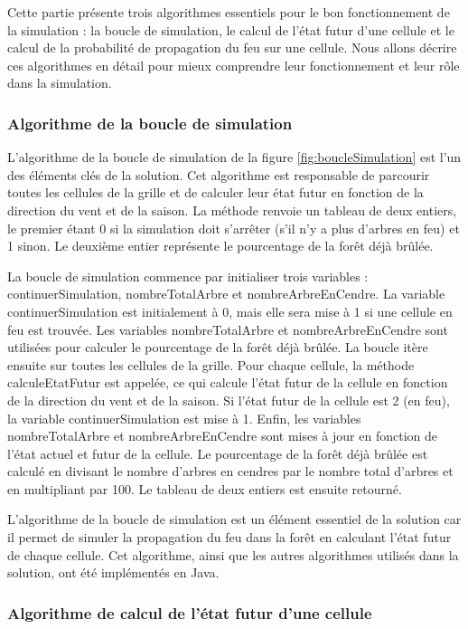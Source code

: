 Cette partie présente trois algorithmes essentiels pour le bon fonctionnement de la simulation : la boucle de simulation, le calcul de l'état futur d'une cellule et le calcul de la probabilité de propagation du feu sur une cellule. Nous allons décrire ces algorithmes en détail pour mieux comprendre leur fonctionnement et leur rôle dans la simulation.

\subsubsection{Algorithme de la boucle de simulation}

L'algorithme de la boucle de simulation de la figure \ref{fig:boucleSimulation} est l'un des éléments clés de la solution. Cet algorithme est responsable de parcourir toutes les cellules de la grille et de calculer leur état futur en fonction de la direction du vent et de la saison. La méthode renvoie un tableau de deux entiers, le premier étant 0 si la simulation doit s'arrêter (s'il n'y a plus d'arbres en feu) et 1 sinon. Le deuxième entier représente le pourcentage de la forêt déjà brûlée.

La boucle de simulation commence par initialiser trois variables : continuerSimulation, nombreTotalArbre et nombreArbreEnCendre. La variable continuerSimulation est initialement à 0, mais elle sera mise à 1 si une cellule en feu est trouvée. Les variables nombreTotalArbre et nombreArbreEnCendre sont utilisées pour calculer le pourcentage de la forêt déjà brûlée. La boucle itère ensuite sur toutes les cellules de la grille. Pour chaque cellule, la méthode calculeEtatFutur est appelée, ce qui calcule l'état futur de la cellule en fonction de la direction du vent et de la saison. Si l'état futur de la cellule est 2 (en feu), la variable continuerSimulation est mise à 1. Enfin, les variables nombreTotalArbre et nombreArbreEnCendre sont mises à jour en fonction de l'état actuel et futur de la cellule. Le pourcentage de la forêt déjà brûlée est calculé en divisant le nombre d'arbres en cendres par le nombre total d'arbres et en multipliant par 100. Le tableau de deux entiers est ensuite retourné.

L'algorithme de la boucle de simulation est un élément essentiel de la solution car il permet de simuler la propagation du feu dans la forêt en calculant l'état futur de chaque cellule. Cet algorithme, ainsi que les autres algorithmes utilisés dans la solution, ont été implémentés en Java.

\subsubsection{Algorithme de calcul de l’état futur d’une cellule}
\label{sec:calculEtatFutur}


